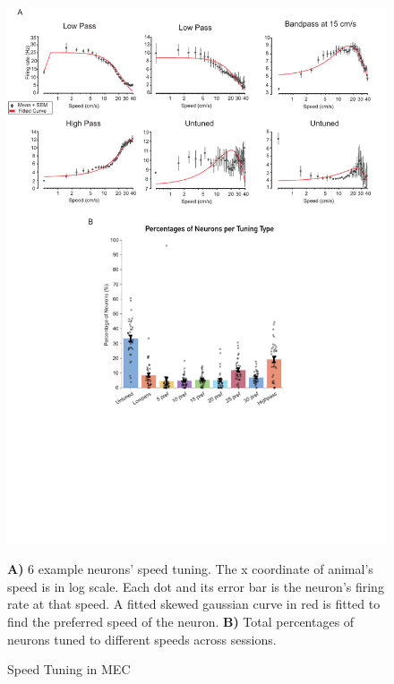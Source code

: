 \begin{figure}
    \centering
    \includegraphics[width=1\linewidth]{figures//Chapter 5 MEC/fig2_speed_tuning.pdf}
    \caption{Speed Tuning in MEC}
    \label{fig:placeholder}
\medskip
\small
\textbf{A)} 6 example neurons' speed tuning. The x coordinate of animal's speed is in log scale. Each dot and its error bar is the neuron's firing rate at that speed. A fitted skewed gaussian curve in red is fitted to find the preferred speed of the neuron. \textbf{B)} Total percentages of neurons tuned to different speeds across sessions.
\end{figure}

